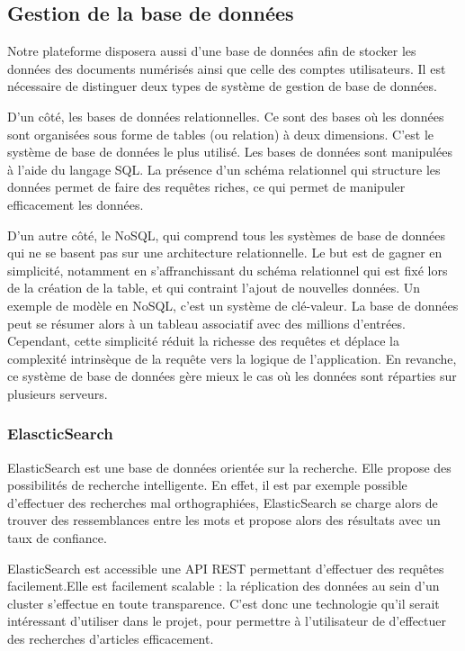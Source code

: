     \subsection{Gestion de la base de données}
    \label{subsec:bdd}

   Notre plateforme disposera aussi d’une base de données afin de stocker les données des documents numérisés
   ainsi que celle des comptes utilisateurs. Il est nécessaire de distinguer deux types de système de gestion de base de données.

    D’un côté, les bases de données relationnelles. Ce sont des bases où les données sont organisées
    sous forme de tables (ou relation) à deux dimensions. C’est le système de base de données le plus utilisé.
    Les bases de données sont manipulées à l’aide du langage SQL. La présence d’un schéma relationnel qui structure
    les données permet de faire des requêtes riches, ce qui permet de manipuler efficacement les données.

    D’un autre côté, le NoSQL, qui comprend tous les systèmes de base de données qui ne se basent pas sur une
    architecture relationnelle. Le but est de gagner en simplicité, notamment en s’affranchissant du schéma relationnel
    qui est fixé lors de la création de la table, et qui contraint l’ajout de nouvelles données. Un exemple de modèle en NoSQL,
    c’est un système de clé-valeur. La base de données peut se résumer alors à un tableau associatif avec des millions d’entrées.
    Cependant, cette simplicité réduit la richesse des requêtes et déplace la complexité intrinsèque de la requête vers
    la logique de l’application. En revanche, ce système de base de données gère mieux le cas où les données sont réparties
    sur plusieurs serveurs.

        \subsubsection{ElascticSearch}
        \label{subsubsec:elasticsearch}
        ElasticSearch est une base de données orientée sur la recherche.
        Elle propose des possibilités de recherche intelligente. En effet, il est par exemple possible
        d'effectuer des recherches mal orthographiées, ElasticSearch se charge alors de trouver des ressemblances
        entre les mots et propose alors des résultats avec un taux de confiance.

        ElasticSearch est accessible une API REST permettant d'effectuer des requêtes facilement.Elle est facilement scalable :
        la réplication des données au sein d'un cluster s'effectue en toute transparence.
        C'est donc une technologie qu'il serait intéressant d'utiliser dans le projet, pour permettre à l'utilisateur
        de d'effectuer des recherches d'articles efficacement.


